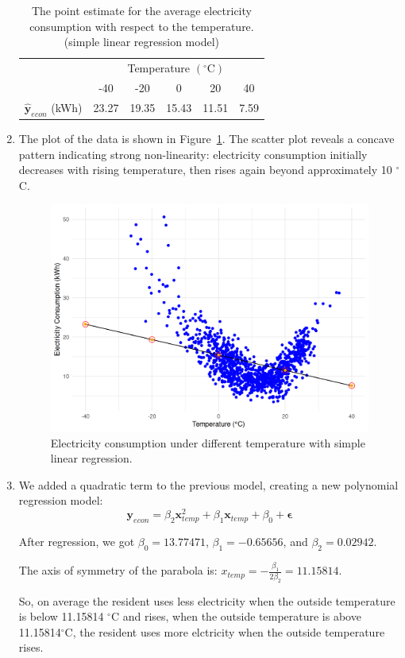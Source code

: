 \documentclass[12pt]{article}
\begin{document}
\begin{enumerate}
\begin{table}[htpb]
	\centering
	\begin{tabular}{cccccc}
		\toprule
		\multirow{2}{*}{} &
		\multicolumn{5}{c}{Temperature $(^{\circ}\text{C})$}\\
		 & -40 & -20 & 0 & 20 & 40 \\
		\midrule
		$\hat{\mathbf{y}}_{econ}$ (kWh)&23.27&19.35&15.43&11.51&7.59\\
		\bottomrule
	\end{tabular}
	\caption{The point estimate for the average electricity consumption with respect to the temperature. (simple linear regression model)}
	\label{Tab:1}
\end{table}
\item The plot of the data is shown in Figure~\ref{Fig:1}.
The scatter plot reveals a concave pattern indicating strong non-linearity: electricity consumption initially decreases with rising temperature, then rises again beyond approximately 10 $^{\circ}$C.
\begin{figure}[htbp]
\includegraphics[width=.7\textwidth]{1.png}
\centering
\caption{Electricity consumption under different temperature with simple linear regression.}
\label{Fig:1}
\end{figure}
\item We added a quadratic term to the previous model, creating a new polynomial regression model:
\[
\mathbf{y}_{econ} = \beta_2 \mathbf{x}_{temp}^{2}
+\beta_1 \mathbf{x}_{temp} + \beta_0 + \mathbf{\epsilon}
\] 

After regression, we got $\beta_0 = 13.77471$, $\beta_1 = -0.65656$, and $\beta_2 = 0.02942$.

The axis of symmetry of the parabola is: $x_{temp} =  -\frac{\beta_1}{2\beta_2} = 11.15814$.

So, on average the resident uses less electricity when the outside temperature is below 11.15814 $^{\circ}$C and rises, when the outside temperature is above 11.15814$^{\circ}$C, the resident uses more elctricity when the outside temperature rises.


\end{enumerate}
\end{document}
